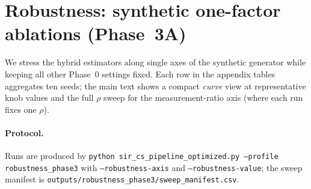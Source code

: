 
\section{Robustness: synthetic one-factor ablations (Phase~3A)}
\label{sec:exp_robustness}

We stress the hybrid estimators along single axes of the synthetic generator while keeping all other Phase~0 settings fixed.
Each row in the appendix tables aggregates ten seeds; the main text shows a compact \emph{curve} view at representative knob values and the full $\rho$ sweep for the measurement-ratio axis (where each run fixes one $\rho$).

\paragraph{Protocol.}
Runs are produced by \texttt{python sir\_cs\_pipeline\_optimized.py --profile robustness\_phase3} with \texttt{--robustness-axis} and \texttt{--robustness-value}; the sweep manifest is \texttt{outputs/robustness\_phase3/sweep\_manifest.csv}.

